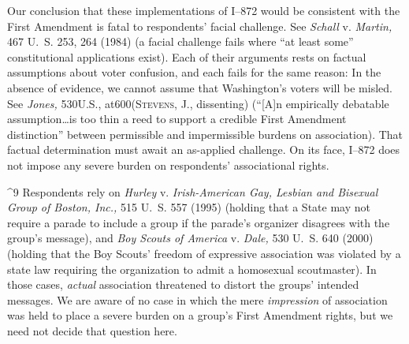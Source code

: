   Our conclusion that these implementations of I--872 would be
consistent with the First Amendment is fatal to respondents'
facial challenge. See \emph{Schall} v. \emph{Martin,} 467 U.~S. 253,
264 (1984) (a facial challenge fails where ``at least some''
constitutional applications exist). Each of their arguments rests on
factual assumptions about voter confusion, and each fails for the same
reason: In the absence of evidence, we cannot assume that Washington's
voters will be misled. See \emph{Jones,} 530U.S., at600(\textsc{Stevens,}
J., dissenting) (``[A]n empirically debatable assumption\dots is
too thin a reed to support a credible First Amendment distinction''
between permissible and impermissible burdens on association). That
\newpage  factual determination must await an as-applied challenge. On
its face, I--872 does not impose any severe burden on respondents'
associational rights.

^9 Respondents rely on \emph{Hurley} v. \emph{Irish-American Gay, Lesbian and
Bisexual Group of Boston, Inc.,} 515 U.~S. 557 (1995) (holding that
a State may not require a parade to include a group if the parade's
organizer disagrees with the group's message), and \emph{Boy Scouts of
America} v. \emph{Dale,} 530 U.~S. 640 (2000) (holding that the Boy
Scouts' freedom of expressive association was violated by a state
law requiring the organization to admit a homosexual scoutmaster).
In those cases, \emph{actual} association threatened to distort the
groups' intended messages. We are aware of no case in which the mere
\emph{impression} of association was held to place a severe burden on a
group's First Amendment rights, but we need not decide that question
here.

